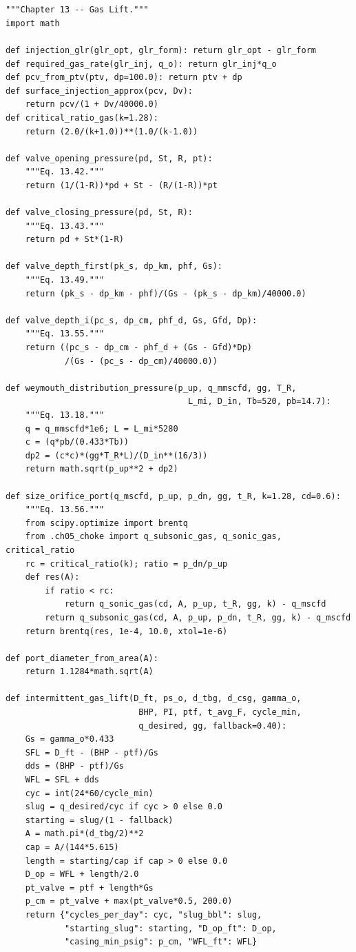 \documentclass[10pt,a4paper,openany]{book}
\begin{document}
\chapter{}
\begin{lstlisting}
"""Chapter 13 -- Gas Lift."""
import math

def injection_glr(glr_opt, glr_form): return glr_opt - glr_form
def required_gas_rate(glr_inj, q_o): return glr_inj*q_o
def pcv_from_ptv(ptv, dp=100.0): return ptv + dp
def surface_injection_approx(pcv, Dv):
    return pcv/(1 + Dv/40000.0)
def critical_ratio_gas(k=1.28):
    return (2.0/(k+1.0))**(1.0/(k-1.0))

def valve_opening_pressure(pd, St, R, pt):
    """Eq. 13.42."""
    return (1/(1-R))*pd + St - (R/(1-R))*pt

def valve_closing_pressure(pd, St, R):
    """Eq. 13.43."""
    return pd + St*(1-R)

def valve_depth_first(pk_s, dp_km, phf, Gs):
    """Eq. 13.49."""
    return (pk_s - dp_km - phf)/(Gs - (pk_s - dp_km)/40000.0)

def valve_depth_i(pc_s, dp_cm, phf_d, Gs, Gfd, Dp):
    """Eq. 13.55."""
    return ((pc_s - dp_cm - phf_d + (Gs - Gfd)*Dp)
            /(Gs - (pc_s - dp_cm)/40000.0))

def weymouth_distribution_pressure(p_up, q_mmscfd, gg, T_R,
                                     L_mi, D_in, Tb=520, pb=14.7):
    """Eq. 13.18."""
    q = q_mmscfd*1e6; L = L_mi*5280
    c = (q*pb/(0.433*Tb))
    dp2 = (c*c)*(gg*T_R*L)/(D_in**(16/3))
    return math.sqrt(p_up**2 + dp2)

def size_orifice_port(q_mscfd, p_up, p_dn, gg, t_R, k=1.28, cd=0.6):
    """Eq. 13.56."""
    from scipy.optimize import brentq
    from .ch05_choke import q_subsonic_gas, q_sonic_gas, critical_ratio
    rc = critical_ratio(k); ratio = p_dn/p_up
    def res(A):
        if ratio < rc:
            return q_sonic_gas(cd, A, p_up, t_R, gg, k) - q_mscfd
        return q_subsonic_gas(cd, A, p_up, p_dn, t_R, gg, k) - q_mscfd
    return brentq(res, 1e-4, 10.0, xtol=1e-6)

def port_diameter_from_area(A):
    return 1.1284*math.sqrt(A)

def intermittent_gas_lift(D_ft, ps_o, d_tbg, d_csg, gamma_o,
                           BHP, PI, ptf, t_avg_F, cycle_min,
                           q_desired, gg, fallback=0.40):
    Gs = gamma_o*0.433
    SFL = D_ft - (BHP - ptf)/Gs
    dds = (BHP - ptf)/Gs
    WFL = SFL + dds
    cyc = int(24*60/cycle_min)
    slug = q_desired/cyc if cyc > 0 else 0.0
    starting = slug/(1 - fallback)
    A = math.pi*(d_tbg/2)**2
    cap = A/(144*5.615)
    length = starting/cap if cap > 0 else 0.0
    D_op = WFL + length/2.0
    pt_valve = ptf + length*Gs
    p_cm = pt_valve + max(pt_valve*0.5, 200.0)
    return {"cycles_per_day": cyc, "slug_bbl": slug,
            "starting_slug": starting, "D_op_ft": D_op,
            "casing_min_psig": p_cm, "WFL_ft": WFL}
\end{lstlisting}
\end{document}
